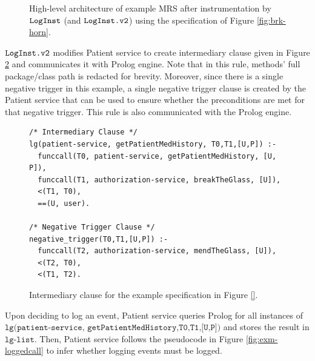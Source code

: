 \begin{figure} 
	\centering
	\caption{High-level architecture of example MRS after instrumentation by $\texttt{LogInst}$ (and $\texttt{LogInst.v2}$) using the specification of Figure \ref{fig:brk-horn}.}
	\label{fig:mrs-mics-target}
\end{figure}

$\texttt{LogInst.v2}$ modifies Patient service to create intermediary clause given in Figure \ref{fig:exm-intermediary} and communicates it with Prolog engine. Note that in this rule, methods' full package/class path is redacted for brevity. Moreover, since there is a single negative trigger in this example, a single negative trigger clause is created by the Patient service that can be used to ensure whether the preconditions are met for that negative trigger. This rule is also communicated with the Prolog engine.

\begin{figure}
\begin{tiny}
\begin{Verbatim}[frame=single]
/* Intermediary Clause */
lg(patient-service, getPatientMedHistory, T0,T1,[U,P]) :- 
  funccall(T0, patient-service, getPatientMedHistory, [U, P]),
  funccall(T1, authorization-service, breakTheGlass, [U]),
  <(T1, T0),
  ==(U, user).

/* Negative Trigger Clause */ 
negative_trigger(T0,T1,[U,P]) :-
  funccall(T2, authorization-service, mendTheGlass, [U]),
  <(T2, T0),
  <(T1, T2).
\end{Verbatim}
\end{tiny}
\caption{Intermediary clause for the example specification in Figure \ref{}.}
\label{fig:exm-intermediary}
\end{figure}

Upon deciding to log an event, Patient service queries Prolog for all instances of $\texttt{lg(patient-service, getPatientMedHistory,T0,T1,[U,P])}$ and stores the result in $\texttt{lg-list}$. Then, Patient service follows the pseudocode in Figure \ref{fig:exm-loggedcall} to infer whether logging events must be logged.

